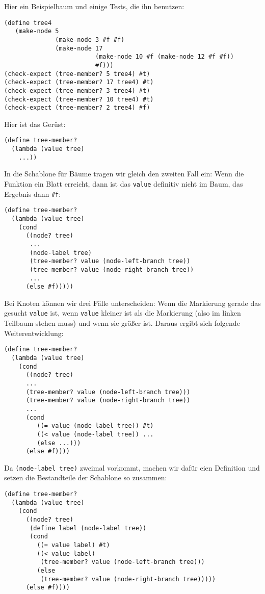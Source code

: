 Hier ein Beispielbaum und einige Tests, die ihn benutzen:
%
\begin{lstlisting}
(define tree4
   (make-node 5
              (make-node 3 #f #f)
              (make-node 17
                         (make-node 10 #f (make-node 12 #f #f))
                         #f)))
(check-expect (tree-member? 5 tree4) #t)
(check-expect (tree-member? 17 tree4) #t)
(check-expect (tree-member? 3 tree4) #t)
(check-expect (tree-member? 10 tree4) #t)
(check-expect (tree-member? 2 tree4) #f)
\end{lstlisting}
%
Hier ist das Gerüst:
\begin{lstlisting}
(define tree-member?
  (lambda (value tree)
    ...))
\end{lstlisting}
%
In die Schablone für Bäume tragen wir gleich den zweiten Fall ein:
Wenn die Funktion ein Blatt erreicht, dann ist das \lstinline{value}
definitiv nicht im Baum, das Ergebnis dann \lstinline{#f}:
%
\begin{lstlisting}
(define tree-member?
  (lambda (value tree)
    (cond
      ((node? tree)
       ...
       (node-label tree)
       (tree-member? value (node-left-branch tree))
       (tree-member? value (node-right-branch tree))
       ...
      (else #f)))))
\end{lstlisting}
%
Bei Knoten können wir drei Fälle unterscheiden: Wenn die Markierung
gerade das gesucht \lstinline{value} ist, wenn \lstinline{value}
kleiner ist als die Markierung (also im linken Teilbaum stehen muss)
und wenn sie größer ist.  Daraus ergibt sich folgende
Weiterentwicklung:
\begin{lstlisting}
(define tree-member?
  (lambda (value tree)
    (cond
      ((node? tree)
      ...
      (tree-member? value (node-left-branch tree)))
      (tree-member? value (node-right-branch tree))
      ...
      (cond
         ((= value (node-label tree)) #t)
         ((< value (node-label tree)) ...
         (else ...)))
      (else #f))))
\end{lstlisting}
%
Da \lstinline{(node-label tree)} zweimal vorkommt, machen wir dafür
eien Definition und setzen die Bestandteile der Schablone so zusammen:
%
\begin{lstlisting}
(define tree-member?
  (lambda (value tree)
    (cond
      ((node? tree)
       (define label (node-label tree))
       (cond
         ((= value label) #t)
         ((< value label)
          (tree-member? value (node-left-branch tree)))
         (else
          (tree-member? value (node-right-branch tree)))))
      (else #f))))
\end{lstlisting}
%

